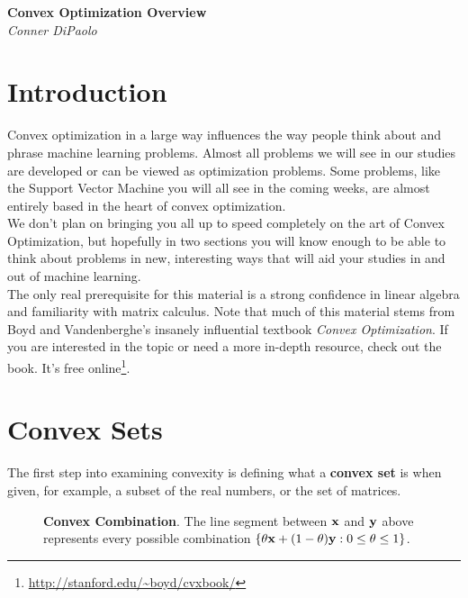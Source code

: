 \documentclass{article}
\begin{document}
\begin{center}
  \Large\textbf{Convex Optimization Overview}\\
  \large\textit{Conner DiPaolo}
\end{center}
\vspace*{1em}

\tableofcontents
\vspace{1em}

\section{Introduction}

Convex optimization in a large way influences the way
people think about and phrase machine learning problems.
Almost all problems we will see in our studies are developed
or can be viewed as optimization problems. Some problems,
like the Support Vector Machine you will all see in the coming
weeks, are almost entirely based in the heart of convex optimization.\\

We don't plan on bringing you all up to speed completely on
the art of Convex Optimization, but hopefully in two sections you
will know enough to be able to think about problems in new, interesting
ways that will aid your studies in and out of machine learning.\\

The only real prerequisite for this material is a strong confidence
in linear algebra and familiarity with matrix calculus. Note that
much of this material stems from Boyd and Vandenberghe's insanely influential
textbook \textit{Convex Optimization}. If you are interested in the
topic or need a more in-depth resource, check out the book. It's free
online\footnote{\url{http://stanford.edu/~boyd/cvxbook/}}.

\section{Convex Sets}



The first step into examining convexity is defining what a
\textbf{convex set} is when given, for example, a subset of the real numbers,
or the set of matrices.

\begin{figure}
    \centering
    \begin{center}
    \end{center}
    \caption{\textbf{Convex Combination}. The line segment between ${\bf x}$ and ${\bf y}$ 
    above represents every possible combination $\{\theta{\bf x} + (1-\theta){\bf y} : 
    0\leq\theta\leq1\}$.}
    \label{fig:convex-comb}
\end{figure}
\end{document}
